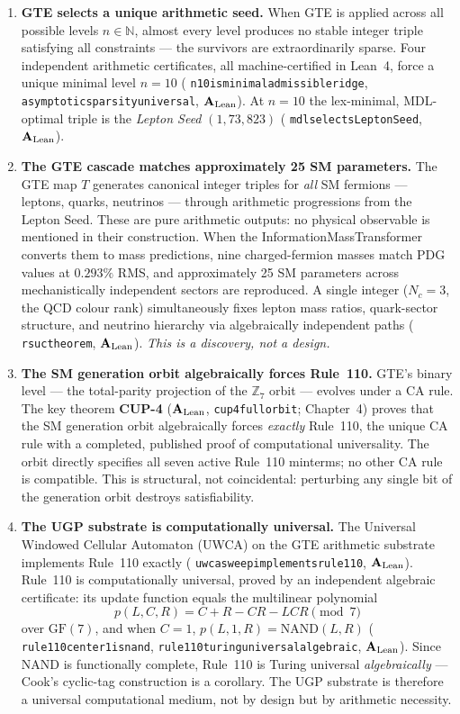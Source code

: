 \documentclass[11pt,openany]{book}
\theoremstyle{remark}
\newcommand{\lean}[1]{%
  \penalty-100
  \begingroup\def\_{\textunderscore\allowbreak}\texttt{#1}\endgroup}
\newcommand{\CatAL}{\ensuremath{\textbf{A}_{\rm Lean}}}
\begin{document}
\begin{enumerate}[label=(\alph*),leftmargin=1.4em,itemsep=2pt]

\item \textbf{GTE selects a unique arithmetic seed.}
When GTE is applied across all possible levels $n \in \mathbb{N}$, almost
every level produces no stable integer triple satisfying all constraints ---
the survivors are extraordinarily sparse.
Four independent arithmetic certificates, all machine-certified in Lean~4,
force a unique minimal level $n=10$ (\lean{n10\_is\_minimal\_admissible\_ridge},
\lean{asymptotic\_sparsity\_universal}, \CatAL).
At $n=10$ the lex-minimal, MDL-optimal triple is the \emph{Lepton Seed}
$(1,73,823)$ (\lean{mdl\_selects\_LeptonSeed}, \CatAL).

\item \textbf{The GTE cascade matches approximately 25 SM parameters.}
The GTE map $T$ generates canonical integer triples for \emph{all} SM
fermions --- leptons, quarks, neutrinos --- through arithmetic progressions
from the Lepton Seed.
These are pure arithmetic outputs: no physical observable is mentioned in
their construction.
When the InformationMassTransformer converts them to mass predictions, nine
charged-fermion masses match PDG values at $\mathbf{0.293\%}$ RMS, and
approximately 25 SM parameters across mechanistically independent sectors
are reproduced.
A single integer ($N_c=3$, the QCD colour rank) simultaneously fixes lepton
mass ratios, quark-sector structure, and neutrino hierarchy via algebraically
independent paths (\lean{rsuc\_theorem}, \CatAL).
\emph{This is a discovery, not a design.}

\item \textbf{The SM generation orbit algebraically forces Rule~110.}
GTE's binary level --- the total-parity projection of the $\mathbb{Z}_7$
orbit --- evolves under a CA rule.
The key theorem \textbf{CUP-4} (\CatAL, \lean{cup4\_full\_orbit};
Chapter~4) proves that the SM generation orbit algebraically forces
\emph{exactly} Rule~110, the unique CA rule with a completed, published
proof of computational universality.
The orbit directly specifies all seven active Rule~110 minterms; no other
CA rule is compatible.
This is structural, not coincidental: perturbing any single bit of the
generation orbit destroys satisfiability.

\item \textbf{The UGP substrate is computationally universal.}
The Universal Windowed Cellular Automaton (UWCA) on the GTE arithmetic
substrate implements Rule~110 exactly
(\lean{uwca\_sweep\_implements\_rule110}, \CatAL).
Rule~110 is computationally universal, proved by an independent algebraic
certificate: its update function equals the multilinear polynomial
\[
  p(L,C,R) = C+R-CR-LCR \pmod{7}
\]
over $\mathrm{GF}(7)$, and when $C=1$, $p(L,1,R) = \mathrm{NAND}(L,R)$
(\lean{rule110\_center1\_is\_nand}, \lean{rule110\_turing\_universal\_algebraic},
\CatAL).
Since NAND is functionally complete, Rule~110 is Turing universal
\emph{algebraically} --- Cook's cyclic-tag construction is a corollary.
The UGP substrate is therefore a universal computational medium, not by
design but by arithmetic necessity.


\end{enumerate}
\end{document}
